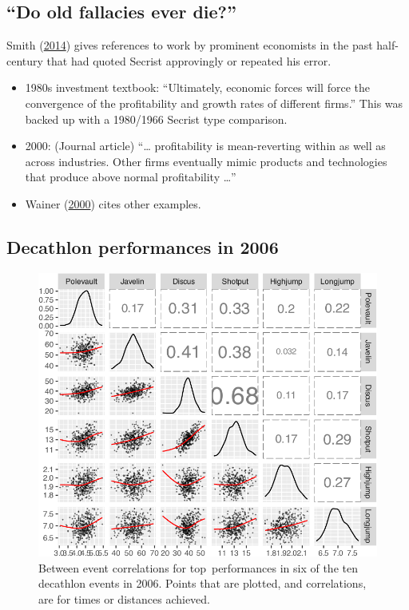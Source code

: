 \documentclass[
  10pt,
  b5paper]{book}
\providecommand{\tightlist}{%
  \setlength{\itemsep}{0pt}\setlength{\parskip}{0pt}}
\begin{document}
\hypertarget{do-old-fallacies-ever-die}{%
\subsection*{``Do old fallacies ever die?''}\label{do-old-fallacies-ever-die}}

Smith (\protect\hyperlink{ref-smith-sd}{2014}) gives references to work by prominent economists in the past half-century that had quoted Secrist approvingly or repeated his error.

\begin{itemize}
\tightlist
\item
  1980s investment textbook: ``Ultimately, economic forces will force the convergence of the profitability and growth rates of different firms.'' This was backed up with a 1980/1966 Secrist type comparison.
\item
  2000: (Journal article) ``\ldots{} profitability is mean-reverting within as well as across industries. Other firms eventually mimic products and technologies that produce above normal profitability \ldots{}''
\item
  Wainer (\protect\hyperlink{ref-wainerRegress}{2000}) cites other examples.
\end{itemize}

\hypertarget{decathlon-performances-in-2006}{%
\subsection*{Decathlon performances in 2006}\label{decathlon-performances-in-2006}}

\begin{figure}[H]

{\centering \includegraphics[width=0.68\linewidth]{07-regress_files/figure-latex/selected-1} 

}

\caption{Between event correlations for top performances in six
of the ten decathlon events in 2006.  Points that are plotted,
and correlations, are for times or distances achieved.}\label{fig:selected}
\end{figure}
\end{document}
